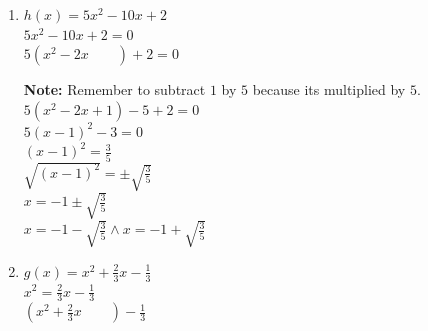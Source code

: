 \begin{example}
\begin{enumerate}
\begin{center}
    \end{center}
    $(x^2 - 3x + \frac{9}{4}) -\frac{9}{4} + 1 = 0$ \\
    $(x - \frac{3}{2})^2 - \frac{5}{4} = 0$ \\
    $(x - \frac{3}{2})^2 = \frac{5}{4}$ \\
    $\sqrt{(x - \frac{3}{2})^2} = \pm \sqrt{\frac{5}{4}}$ \\
    $x -\frac{3}{2} = \pm \frac{\sqrt{5}}{2}$ \\
    $x = \frac{3}{2} \pm \frac{\sqrt{5}}{2}$ \\
    $x = \frac{3 + \sqrt{5}}{2} \land x = \frac{3 - \sqrt{5}}{2}$
  \item $h(x) = 5x^2 - 10x + 2$ \\
    $5x^2 - 10x + 2 = 0$ \\
    $5(x^2 - 2x \qquad) + 2 = 0$ \\
    \begin{center}
    \end{center}
    \textbf{Note: }Remember to subtract $1$ by $5$ because its multiplied by $5$. \\
    $5(x^2 - 2x + 1) - 5 + 2 = 0$ \\
    $5(x - 1)^2 - 3 = 0$ \\
    $(x - 1)^2 = \frac{3}{5}$ \\
    $\sqrt{(x - 1)^2} = \pm \sqrt{\frac{3}{5}}$ \\
    $x = -1 \pm \sqrt{\frac{3}{5}}$ \\
    $x = -1 - \sqrt{\frac{3}{5}} \land x = -1 + \sqrt{\frac{3}{5}}$
  \item $g(x) = x^2 + \frac{2}{3}x - \frac{1}{3}$ \\
    $x^2 = \frac{2}{3}x - \frac{1}{3}$ \\
    $(x^2 + \frac{2}{3}x \qquad) - \frac{1}{3}$ \\

\end{enumerate}
\end{example}
